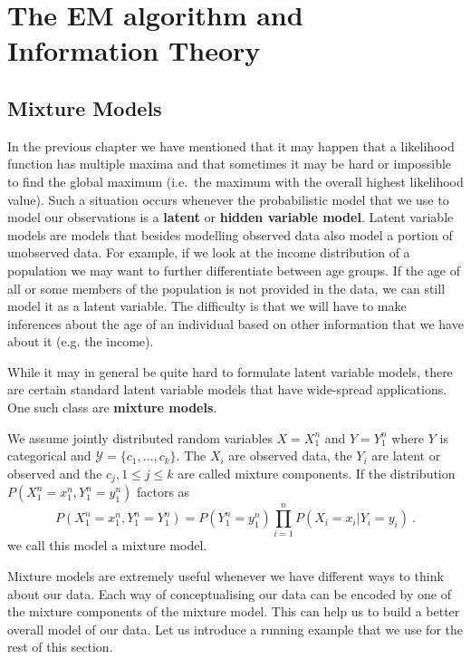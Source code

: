 \chapter{The EM algorithm and Information Theory}

\section{Mixture Models}\label{sec:mixtureModels}

In the previous chapter we have mentioned that it may happen that a likelihood function has multiple 
maxima and that sometimes it may be hard or impossible to find the global maximum (i.e.\ the maximum
with the overall highest likelihood value). Such a situation occurs whenever the probabilistic model
that we use to model our observations is a \textbf{latent} or \textbf{hidden variable model}. Latent variable
models are models that besides modelling observed data also model a portion of unobserved data. For
example, if we look at the income distribution of a population we may want to further differentiate
between age groups. If the age of all or some members of the population is not provided in the data, we
can still model it as a latent variable. The difficulty is that we will have to make inferences about the
age of an individual based on other information that we have about it (e.g. the income). 

While it may in general be quite hard to formulate latent variable models, there are certain standard
latent variable models that have wide-spread applications. One such class are \textbf{mixture models}.

\begin{Definition}\label{def:mixtureModel}
We assume jointly distributed random variables $ X=X_{1}^{n} $ and $ Y=Y_{1}^{n} $ where $ Y $ is categorical and
$ \mathcal{Y} = \{c_{1}, \ldots, c_{k}\} $. The $ X_{i} $ are observed data, the $ Y_{i} $ are latent
or observed and the $ c_{j}, 1\leq j \leq k $ are called mixture components. 
If the distribution
$ P(X_{1}^{n}=x_{1}^{n}, Y_{1}^{n} = y_{1}^{n}) $ factors as
$$ P(X_{1}^{n}=x_{1}^{n}, Y_{1}^{n} = Y_{1}^{n})= P(Y_{1}^{n} = y_{1}^{n}) \prod_{i=1}^{n} P(X_{i}=x_{i}|Y_{i} = y_{i}) \ . $$
we call this model a mixture model.
\end{Definition}

Mixture models are extremely useful whenever we have different ways to think about our data. Each way
of conceptualising our data can be encoded by one of the mixture components of the mixture model.
This can help us to build a better overall model of our data. Let us introduce a running example that
we use for the rest of this section. 

